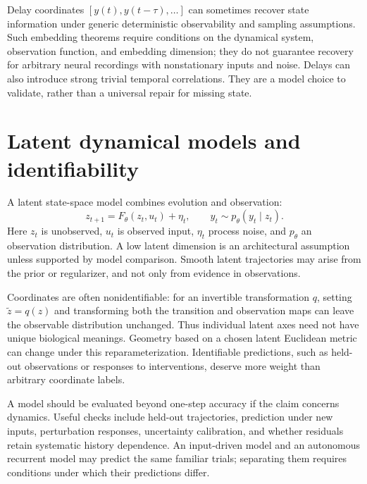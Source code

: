 Delay coordinates $[y(t),y(t-\tau),\ldots]$ can sometimes recover state information under generic deterministic observability and sampling assumptions. Such embedding theorems require conditions on the dynamical system, observation function, and embedding dimension; they do not guarantee recovery for arbitrary neural recordings with nonstationary inputs and noise. Delays can also introduce strong trivial temporal correlations. They are a model choice to validate, rather than a universal repair for missing state.

\section{Latent dynamical models and identifiability}
A latent state-space model combines evolution and observation:
\begin{equation}\label{eq:latent-dynamics}
z_{t+1}=F_\theta(z_t,u_t)+\eta_t,\qquad
y_t\sim p_\theta(y_t\mid z_t).
\end{equation}
Here $z_t$ is unobserved, $u_t$ is observed input, $\eta_t$ process noise, and $p_\theta$ an observation distribution. A low latent dimension is an architectural assumption unless supported by model comparison. Smooth latent trajectories may arise from the prior or regularizer, and not only from evidence in observations.

Coordinates are often nonidentifiable: for an invertible transformation $q$, setting $\widetilde z=q(z)$ and transforming both the transition and observation maps can leave the observable distribution unchanged. Thus individual latent axes need not have unique biological meanings. Geometry based on a chosen latent Euclidean metric can change under this reparameterization. Identifiable predictions, such as held-out observations or responses to interventions, deserve more weight than arbitrary coordinate labels.

A model should be evaluated beyond one-step accuracy if the claim concerns dynamics. Useful checks include held-out trajectories, prediction under new inputs, perturbation responses, uncertainty calibration, and whether residuals retain systematic history dependence. An input-driven model and an autonomous recurrent model may predict the same familiar trials; separating them requires conditions under which their predictions differ.

